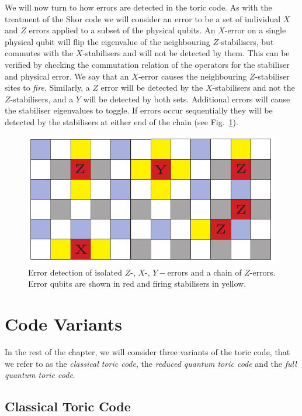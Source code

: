 We will now turn to how errors are detected in the toric code. As with the treatment of the Shor code we will consider an error to be a set of individual $X$ and $Z$ errors applied to a subset of the physical qubits. An $X$-error on a single physical qubit will flip the eigenvalue of the neighbouring $Z$-stabilisers, but commutes with the $X$-stabilisers and will not be detected by them. This can be verified by checking the commutation relation of the operators for the stabiliser and physical error. We say that an $X$-error causes the neighbouring $Z$-stabiliser sites to \textit{fire}. Similarly, a $Z$ error will be detected by the $X$-stabilisers and not the $Z$-stabilisers, and a $Y$ will be detected by both sets. Additional errors will cause the stabiliser eigenvalues to toggle. If errors occur sequentially they will be detected by the stabilisers at either end of the chain (see Fig.~\ref{basic_errors}).

\begin{figure}[htb]
  \begin{center}
    \includegraphics{assets/basic_errors.pdf}
  \end{center}
  \caption{Error detection of isolated $Z$-, $X$-, $Y-$errors and a chain of $Z$-errors. Error qubits are shown in red and firing stabilisers in yellow.}
  \label{basic_errors}
\end{figure}

\section{Code Variants}

In the rest of the chapter, we will consider three variants of the toric code, that we refer to as the \textit{classical toric code}, the \textit{reduced quantum toric code} and the \textit{full quantum toric code}.

\subsection{Classical Toric Code}

